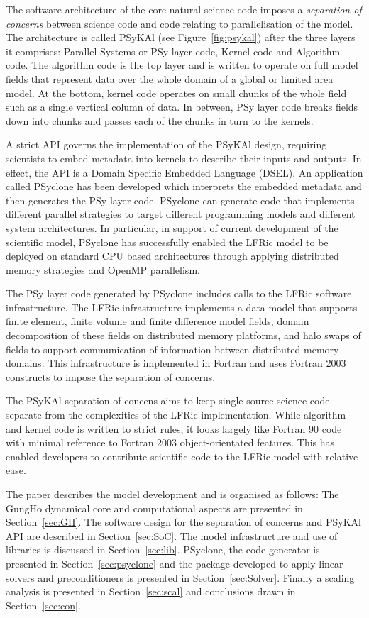 \documentclass[review,times]{elsarticle}
\begin{document}
The software architecture of the core natural science code imposes a
{\em separation of concerns} between science code and code relating to
parallelisation of the model. The architecture is called PSyKAl (see
Figure~\ref{fig:psykal}) after the three layers it comprises: Parallel
Systems or PSy layer code, Kernel code and Algorithm code. The
algorithm code is the top layer and is written to operate on full
model fields that represent data over the whole domain of a global or
limited area model. At the bottom, kernel code operates on small
chunks of the whole field such as a single vertical column of data. In
between, PSy layer code breaks fields down into chunks and passes each
of the chunks in turn to the kernels.

A strict API governs the implementation of the PSyKAl design,
requiring scientists to embed metadata into kernels to describe their
inputs and outputs. In effect, the API is a Domain Specific Embedded
Language (DSEL). An application called PSyclone has been developed
which interprets the embedded metadata and then generates the PSy
layer code. PSyclone can generate code that implements different
parallel strategies to target different programming models and
different system architectures. In particular, in support of current
development of the scientific model, PSyclone has successfully enabled
the LFRic model to be deployed on standard CPU based architectures through
applying distributed memory strategies and OpenMP parallelism.

The PSy layer code generated by PSyclone includes calls to the LFRic
software infrastructure. The LFRic infrastructure implements a data
model that supports finite element, finite volume and finite
difference model fields, domain decomposition of these fields on
distributed memory platforms, and halo swaps of fields to support
communication of information between distributed memory domains. This
infrastructure is implemented in Fortran and uses Fortran 2003
constructs to impose the separation of concerns.

The PSyKAl separation of concens aims to keep single source science
code separate from the complexities of the LFRic implementation. While
algorithm and kernel code is written to strict rules, it looks largely
like Fortran 90 code with minimal reference to Fortran 2003
object-orientated features. This has enabled developers to contribute
scientific code to the LFRic model with relative ease.

The paper describes the model development and is organised as follows:
The GungHo dynamical core and computational aspects are presented in
Section~\ref{sec:GH}. The software design for the separation of
concerns and PSyKAl API are described in
Section~\ref{sec:SoC}. The model infrastructure and use of libraries
is discussed in Section~\ref{sec:lib}. PSyclone, the code generator is
presented in Section~\ref{sec:psyclone} and the package developed to
apply linear solvers and preconditioners is presented in Section~\ref{sec:Solver}.
Finally a scaling analysis is presented in Section~\ref{sec:scal} and
conclusions drawn in Section~\ref{sec:con}.
\end{document}
